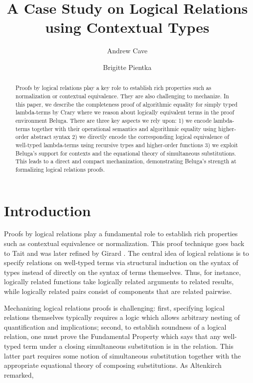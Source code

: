 \documentclass[copyright,creativecommons]{eptcs}
\title{A Case Study on Logical Relations using Contextual Types}
\author{
Andrew Cave 
\institute{McGill University}
\institute{ Montreal QC, Canada}
\email{acave1@cs.mcgill.ca}
\and 
Brigitte Pientka
\institute{McGill University}
\institute{Montreal QC, Canada}
\email{bpientka@cs.mcgill.ca}
}
\begin{document}
\maketitle              

\begin{abstract}
Proofs by logical relations play a key role to establish rich
properties such as normalization or contextual equivalence. They are
also challenging to mechanize. In this paper, we describe the
completeness proof of algorithmic equality for simply typed
lambda-terms by Crary where we reason about logically equivalent terms
in the proof environment Beluga.  There are three key aspects we rely
upon: 1) we encode lambda-terms together with their 
operational semantics and algorithmic equality using higher-order abstract
syntax  2) we directly encode the corresponding
logical equivalence of well-typed lambda-terms using recursive types and 
higher-order functions 3) we exploit Beluga's support for contexts and
the equational theory of simultaneous substitutions. This leads to a
direct and compact mechanization, demonstrating Beluga's strength at
formalizing logical relations proofs.  
\end{abstract}


\newcommand{\R}{\mathcal{R}}
\section{Introduction}

Proofs by logical relations play a fundamental role to establish rich properties such as contextual equivalence or normalization. This proof technique goes back to Tait \cite{Tait67} and was later refined by Girard \citep{GirardLafontTaylor:proofsAndTypes}.  The central idea of logical relations is to specify relations on well-typed terms via structural induction on the syntax of types instead of directly on the syntax of terms themselves. Thus, for instance, logically related functions take logically related arguments to related results, while  logically related pairs consist of components that are related pairwise. 

Mechanizing logical relations proofs is challenging: first, specifying logical relations themselves typically requires a logic which allows arbitrary nesting of quantification and implications; second, to establish soundness of a logical relation, one must prove the Fundamental Property which says that any well-typed term under a closing simultaneous substitution is in the relation. This latter part requires some notion of simultaneous substitution together with the appropriate equational theory of composing substitutions. As Altenkirch \cite{Altenkirch:TLCA93} remarked,
\end{document}
